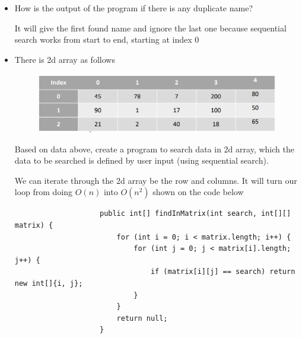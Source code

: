 \documentclass[12pt,titlepage]{article}
\begin{document}
\begin{enumerate}
{\begin{itemize}
{                \begin{verbatim}
                    public int findSeqSearch(String search) {
                        int position = -1;
                        for (int i = 0; i < listStudents.length; i++) {
                            if (listStudents[i].name == search) {
                                position = i;
                                break;
                            }
                        }
                        return position;
                    }
                \end{verbatim}
            }
            \item {
                How is the output of the program if there is any duplicate name?

                It will give the first found name and ignore the last one because sequential search works
                from start to end, starting at index 0
            }
            \item {
                There is 2d array as follows
                
                \begin{figure}[h]
                    \centering
                    \includegraphics[width=.8\textwidth]{./images/2d-array.png}
                \end{figure}
                
                Based on data above, create a program to search data in 2d array, which the data to be searched is defined by user input (using sequential search).

                We can iterate through the 2d array be the row and columns. It will turn our loop from doing \texttt{$O(n)$} into \texttt{$O(n^2)$} shown on the code below

                \begin{verbatim}
                    public int[] findInMatrix(int search, int[][] matrix) {
                        for (int i = 0; i < matrix.length; i++) {
                            for (int j = 0; j < matrix[i].length; j++) {
                                if (matrix[i][j] == search) return new int[]{i, j};
                            }
                        }
                        return null;
                    }
                \end{verbatim}

}
\end{itemize}}
\end{enumerate}
\end{document}
